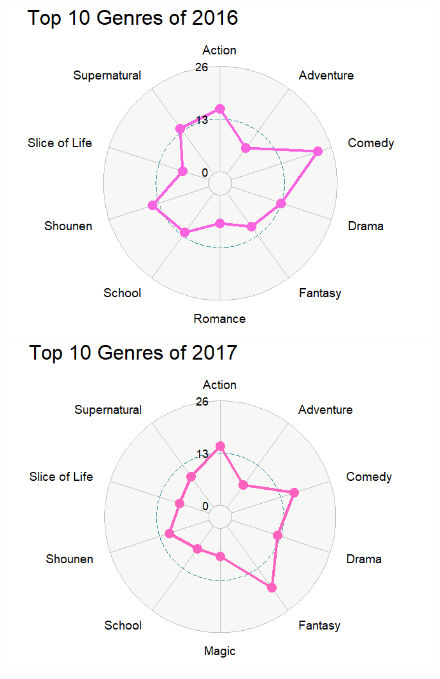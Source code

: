 \documentclass[a4paper]{article}
\begin{document}
	\begin{figure}[!htb]
		\includegraphics[width=\linewidth]{2016Radar.png}
		\endminipage\hfill
		\includegraphics[width=\linewidth]{2017Radar.png}
		\endminipage
	\end{figure}

	\pagebreak
	
\end{document}
